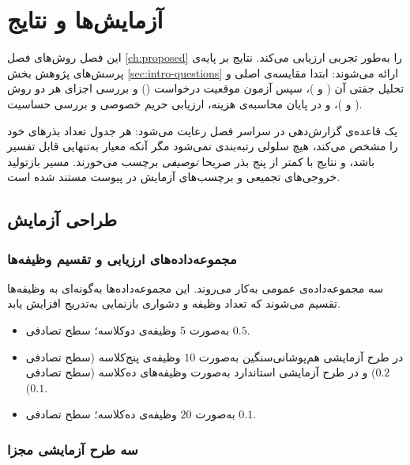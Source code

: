 \chapter{آزمایش‌ها و نتایج}
\label{ch:results}

این فصل روش‌های فصل \ref{ch:proposed} را به‌طور تجربی ارزیابی می‌کند. نتایج بر پایه‌ی پرسش‌های پژوهش بخش \ref{sec:intro-questions} ارائه می‌شوند: ابتدا مقایسه‌ی اصلی و تحلیل جفتی آن ( و )، سپس آزمون موقعیت درخواست () و بررسی اجزای هر دو روش ( و )، و در پایان محاسبه‌ی هزینه، ارزیابی حریم خصوصی و بررسی حساسیت.

یک قاعده‌ی گزارش‌دهی در سراسر فصل رعایت می‌شود: هر جدول تعداد بذرهای خود را مشخص می‌کند، هیچ سلولی رتبه‌بندی نمی‌شود مگر آنکه معیار به‌تنهایی قابل تفسیر باشد، و نتایج با کمتر از پنج بذر صریحا \emph{توصیفی} برچسب می‌خورند. مسیر بازتولید خروجی‌های تجمیعی و برچسب‌های آزمایش در پیوست مستند شده است.

\section{طراحی آزمایش}
\label{sec:res-design}

\subsection{مجموعه‌داده‌های ارزیابی و تقسیم وظیفه‌ها}
\label{subsec:res-benchmarks}

سه مجموعه‌داده‌ی عمومی به‌کار می‌روند. این مجموعه‌داده‌ها به‌گونه‌ای به وظیفه‌ها تقسیم می‌شوند که تعداد وظیفه و دشواری بازنمایی به‌تدریج افزایش یابد.

\begin{itemize}
	\item {} \cite{krizhevsky2009learning} به‌صورت $5$ وظیفه‌ی دوکلاسه؛ سطح تصادفی $0.5$.
	\item {} \cite{krizhevsky2009learning} در طرح آزمایشی هم‌پوشانی‌سنگین به‌صورت $10$ وظیفه‌ی پنج‌کلاسه (سطح تصادفی $0.2$) و در طرح آزمایشی استاندارد به‌صورت وظیفه‌های ده‌کلاسه (سطح تصادفی $0.1$).
	\item {} \cite{le2015tinyimagenet} به‌صورت $20$ وظیفه‌ی ده‌کلاسه؛ سطح تصادفی $0.1$.
\end{itemize}

\subsection{سه طرح آزمایشی مجزا}
\label{subsec:res-protocols}

